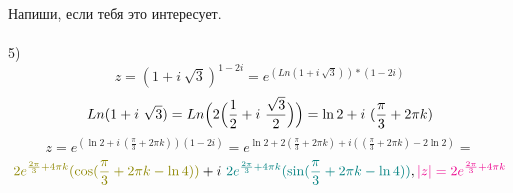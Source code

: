 \documentclass[14pt]{extarticle}
\begin{document}
Напиши, если тебя это интересует.\\ 
\\
5)
\begin{displaymath}
    z=(1+ i \ \sqrt{3})^{1-2i}=e^{(Ln(1+ i \ \sqrt{3}))*(1-2i)}
\end{displaymath}
\begin{displaymath}
    Ln(1+ i \ \sqrt{3})
    =Ln \Bigl(2\Bigl(\frac{1}{2}+i\ \frac{\sqrt{3}}{2}\Bigr)\Bigr)=
    \ln2 + i\ (\frac{\pi}{3}+2\pi k)
\end{displaymath}
\begin{displaymath}
    z=e^{(\ln2 + i\ (\frac{\pi}{3}+2\pi k))(1-2i)}
    =e^{\ln2+2(\frac{\pi}{3}+2\pi k)+i((\frac{\pi}{3}+2\pi k)-2\ln2)}=
\end{displaymath}
\begin{displaymath}
    \textcolor{olive}
    {2e^{\frac{2\pi}{3}+4\pi k}(\cos (\frac{\pi}{3}+2\pi k-\ln4))}+
    i\ \textcolor{teal}
    {2e^{\frac{2\pi}{3}+4\pi k}(\sin (\frac{\pi}{3}+2\pi k-\ln4))}
    , \color{magenta}|z| = 2e^{\frac{2\pi}{3}+4\pi k}
\end{displaymath}
\begin{displaymath}
\end{displaymath}
\begin{displaymath}
\end{displaymath}
\begin{displaymath}
\end{displaymath}
\end{document}
